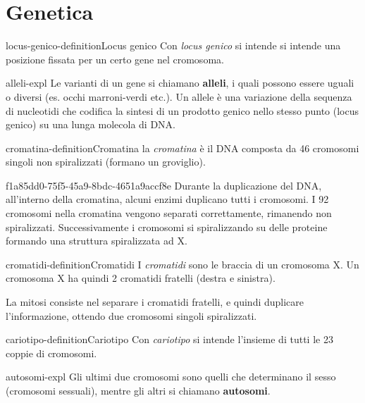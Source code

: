 \documentclass[preview]{standalone}
\begin{document}
\genpage

\section{Genetica}

\begin{snippetdefinition}{locus-genico-definition}{Locus genico}
    Con \textit{locus genico} si intende si intende una posizione fissata per
    un certo gene nel cromosoma.
\end{snippetdefinition}

\begin{snippet}{alleli-expl}
    Le varianti di un gene si chiamano \textbf{alleli}, i quali possono essere uguali o diversi
    (es. occhi marroni-verdi etc.). Un allele è una variazione della sequenza di nucleotidi che codifica la sintesi di un prodotto genico nello stesso punto (locus genico) su una lunga molecola di DNA.
\end{snippet}

\begin{snippetdefinition}{cromatina-definition}{Cromatina}
    la \textit{cromatina} è il DNA composta da 46 cromosomi singoli non spiralizzati (formano un groviglio).
\end{snippetdefinition}

\begin{snippet}{f1a85dd0-75f5-45a9-8bdc-4651a9accf8e}
    Durante la duplicazione del DNA, all'interno della cromatina,
    alcuni enzimi duplicano tutti i cromosomi.
    I 92 cromosomi nella cromatina vengono separati correttamente, rimanendo non spiralizzati.
    Successivamente i cromosomi si spiralizzando su delle proteine formando una struttura spiralizzata ad X.
\end{snippet}


\begin{snippetdefinition}{cromatidi-definition}{Cromatidi}
    I \textit{cromatidi} sono le braccia di un cromosoma X.
    Un cromosoma X ha quindi 2 cromatidi fratelli (destra e sinistra).
\end{snippetdefinition}

\begin{plainhtml}
    La mitosi consiste nel separare i cromatidi fratelli, e quindi duplicare l'informazione,
    ottendo due cromosomi singoli spiralizzati.
\end{plainhtml}

\begin{snippetdefinition}{cariotipo-definition}{Cariotipo}
    Con \textit{cariotipo} si intende l'insieme di tutti le 23 coppie di cromosomi.
\end{snippetdefinition}

\begin{snippet}{autosomi-expl}
    Gli ultimi due cromosomi sono quelli che determinano il sesso (cromosomi sessuali),
    mentre gli altri si chiamano \textbf{autosomi}.
\end{snippet}

\end{document}
